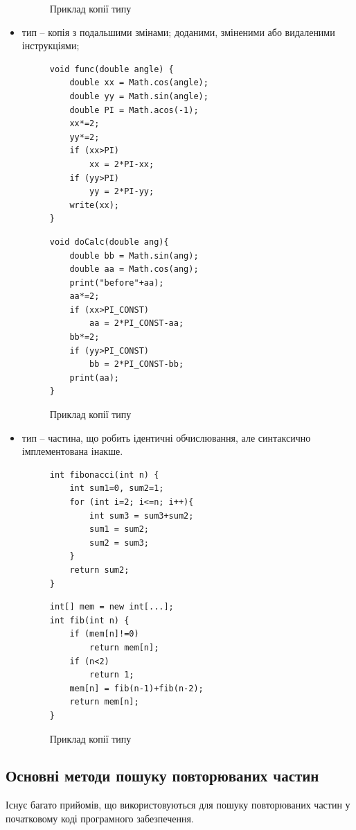 \documentclass[a4paper, 14pt]{article}
\newcommand{\RNum}[1]{\uppercase\expandafter{\romannumeral #1\relax}}
\begin{document}
\begin{itemize}
\begin{figure}[!htb]
\begin{minipage}[t]{.45\textwidth}
\end{minipage}
\caption*{Приклад копії \RNum{2} типу}
\end{figure}
\item \RNum{3} тип -- копія з подальшими змінами; доданими, зміненими або видаленими інструкціями;
\begin{figure}
\centering
\begin{minipage}[t]{.45\textwidth}
\begin{lstlisting}[frame=none]
void func(double angle) {
	double xx = Math.cos(angle);
	double yy = Math.sin(angle);
	double PI = Math.acos(-1);
	xx*=2;
	yy*=2;	
	if (xx>PI)
		xx = 2*PI-xx;
	if (yy>PI)
		yy = 2*PI-yy;
	write(xx);
}
\end{lstlisting}
\end{minipage}
\begin{minipage}[t]{.45\textwidth}
\begin{lstlisting}[frame=none]
void doCalc(double ang){
	double bb = Math.sin(ang);
	double aa = Math.cos(ang);
	print("before"+aa);
	aa*=2;
	if (xx>PI_CONST)
		aa = 2*PI_CONST-aa;
	bb*=2;	
	if (yy>PI_CONST)
		bb = 2*PI_CONST-bb;
	print(aa);
}
\end{lstlisting}
\end{minipage}
\caption*{Приклад копії \RNum{3} типу}
\end{figure}
\item \RNum{4} тип -- частина, що робить ідентичні обчислювання, але синтаксично імплементована інакше.
\begin{figure}
\centering
\begin{minipage}[t]{.45\textwidth}
\begin{lstlisting}[frame=none]
int fibonacci(int n) {
	int sum1=0, sum2=1;
	for (int i=2; i<=n; i++){
		int sum3 = sum3+sum2;
		sum1 = sum2;
		sum2 = sum3;
	}
	return sum2;
}
\end{lstlisting}
\end{minipage}
\begin{minipage}[t]{.45\textwidth}
\begin{lstlisting}[frame=none]
int[] mem = new int[...];
int fib(int n) {
	if (mem[n]!=0)
		return mem[n];
	if (n<2)
		return 1;
	mem[n] = fib(n-1)+fib(n-2);
	return mem[n];
}
\end{lstlisting}
\end{minipage}
\caption*{Приклад копії \RNum{4} типу}
\end{figure}
\end{itemize}
\subsection{Основні методи пошуку повторюваних частин}
Існує багато прийомів, що використовуються для пошуку повторюваних частин у початковому коді програмного забезпечення.
\end{document}
